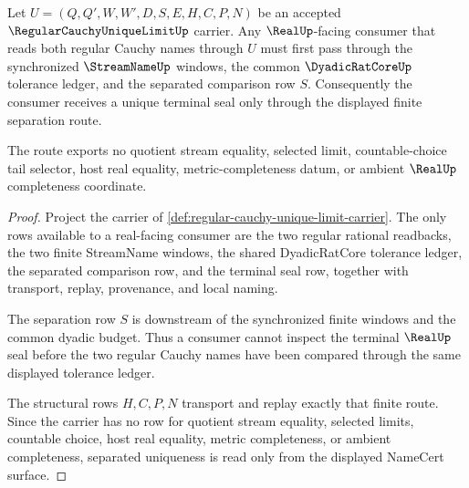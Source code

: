 \begin{theorem}
\label{thm:regular-cauchy-unique-limit-separation}
Let $U=(Q,Q',W,W',D,S,E,H,C,P,N)$ be an accepted $\RegularCauchyUniqueLimitUp$ carrier. Any $\RealUp$-facing consumer that reads both regular Cauchy names through $U$ must first pass through the synchronized $\StreamNameUp$ windows, the common $\DyadicRatCoreUp$ tolerance ledger, and the separated comparison row $S$. Consequently the consumer receives a unique terminal seal only through the displayed finite separation route.

The route exports no quotient stream equality, selected limit, countable-choice tail selector, host real equality, metric-completeness datum, or ambient $\RealUp$ completeness coordinate.
\end{theorem}
\begin{proof}
Project the carrier of \autoref{def:regular-cauchy-unique-limit-carrier}. The only rows available to a real-facing consumer are the two regular rational readbacks, the two finite StreamName windows, the shared DyadicRatCore tolerance ledger, the separated comparison row, and the terminal seal row, together with transport, replay, provenance, and local naming.

The separation row $S$ is downstream of the synchronized finite windows and the common dyadic budget. Thus a consumer cannot inspect the terminal $\RealUp$ seal before the two regular Cauchy names have been compared through the same displayed tolerance ledger.

The structural rows $H,C,P,N$ transport and replay exactly that finite route. Since the carrier has no row for quotient stream equality, selected limits, countable choice, host real equality, metric completeness, or ambient completeness, separated uniqueness is read only from the displayed NameCert surface.
\end{proof}

